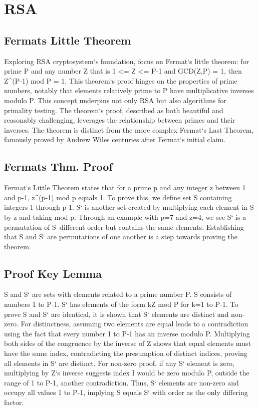 \section*{RSA}

\subsection*{Fermats Little Theorem}
Exploring RSA cryptosystem`s foundation, focus on Fermat`s little theorem: for prime P and any number Z that is 1 \textless{}= Z \textless{}= P-1 and GCD(Z,P) = 1, then Z\textasciicircum{}(P-1) mod P = 1.
This theorem`s proof hinges on the properties of prime numbers, notably that elements relatively prime to P have multiplicative inverses modulo P\@.
This concept underpins not only RSA but also algorithms for primality testing.
The theorem`s proof, described as both beautiful and reasonably challenging, leverages the relationship between primes and their inverses.
The theorem is distinct from the more complex Fermat`s Last Theorem, famously proved by Andrew Wiles centuries after Fermat`s initial claim.

\subsection*{Fermats Thm.  Proof}
Fermat`s Little Theorem states that for a prime p and any integer z between 1 and p-1, z\textasciicircum{}(p-1) mod p equals 1.
To prove this, we define set S containing integers 1 through p-1.
S` is another set created by multiplying each element in S by z and taking mod p.
Through an example with p=7 and z=4, we see S` is a permutation of S--different order but contains the same elements.
Establishing that S and S` are permutations of one another is a step towards proving the theorem.

\subsection*{Proof  Key Lemma}
S and S` are sets with elements related to a prime number P\@.
S consists of numbers 1 to P-1.
S` has elements of the form kZ mod P for k=1 to P-1.
To prove S and S` are identical, it is shown that S` elements are distinct and non-zero.
For distinctness, assuming two elements are equal leads to a contradiction using the fact that every number 1 to P-1 has an inverse modulo P\@.
Multiplying both sides of the congruence by the inverse of Z shows that equal elements must have the same index, contradicting the presumption of distinct indices, proving all elements in S` are distinct.
For non-zero proof, if any S` element is zero, multiplying by Z`s inverse suggests index I would be zero modulo P, outside the range of 1 to P-1, another contradiction.
Thus, S` elements are non-zero and occupy all values 1 to P-1, implying S equals S` with order as the only differing factor.


